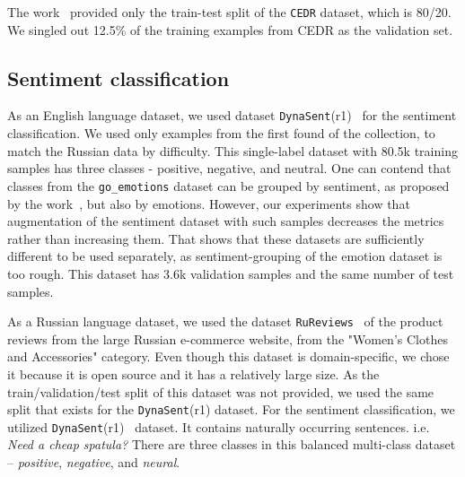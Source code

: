 The work~\cite{ru_emotions} provided only the train-test split of the \texttt{CEDR} dataset, which is 80/20. We singled out 12.5\% of the training examples from CEDR as the validation set. 

\subsection{Sentiment classification}

As an English language dataset, we used dataset \texttt{DynaSent}(r1)~\cite{sentiment} for the sentiment classification. We used only examples from the first found of the collection, to match the Russian data by difficulty. This single-label dataset with 80.5k training samples has three classes - positive, negative, and neutral. One can contend that classes from the \texttt{go\_emotions} dataset can be grouped by sentiment, as proposed by the work~\cite{emotions}, but also by emotions. However, our experiments show that augmentation of the sentiment dataset with such samples decreases the metrics rather than increasing them. That shows that these datasets are sufficiently different to be used separately, as sentiment-grouping of the emotion dataset is too rough. This dataset has 3.6k validation samples and the same number of test samples. 

As a Russian language dataset, we used the dataset \texttt{RuReviews}~\cite{ru_sentiment} of the product reviews from the large Russian e-commerce website, from the "Women’s Clothes and Accessories" category. Even though this dataset is domain-specific, we chose it because it is open source and it has a relatively large size. As the train/validation/test split of this dataset was not provided, we used the same split that exists for the \texttt{DynaSent}(r1) dataset. 
For the sentiment classification, we utilized \texttt{DynaSent}(r1)~\cite{sentiment} dataset. It contains naturally occurring sentences. i.e. \textit{Need a cheap spatula?} There are three classes in this balanced multi-class dataset -- \textit{positive},  \textit{negative}, and \textit{neural}. %


